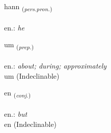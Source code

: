 \documentclass[frontgrid, backgrid]{flacards}\usepackage[]{graphicx}\usepackage[]{xcolor}
\begin{document}
{hann \small{\textsubscript{(\textit{pers.pron.})}} \\[1ex] %
\textphonetic{[han]} \\
en.: \emph{he} \\  [2ex]
\renewcommand*{\arraystretch}{0.8}
}


\renewcommand{\flhead}{\vskip5pt \fboxsep=0pt {\small\bfseries\footnotesize Forsetning | Preposition}}
\renewcommand{\fcfoot}{\vskip5pt \fboxsep=0pt \hspace{2pt}{\small\bfseries\footnotesize 1K}}

\renewcommand{\blhead}{\vskip5pt {\small\bfseries\footnotesize Forsetning | Preposition }}
\renewcommand{\bcfoot}{\vskip5pt \hspace{2pt}{\small\bfseries\footnotesize 1K}}


{um \small{\textsubscript{(\textit{prep.})}} \\[1ex]
\textphonetic{[ʏm]} \\
en.: \emph{about; during; approximately} \\  [2ex]
um (Indeclinable)}


\renewcommand{\flhead}{\vskip5pt \fboxsep=0pt {\small\bfseries\footnotesize Samtenging | Conjuction}}
\renewcommand{\fcfoot}{\vskip5pt \fboxsep=0pt \hspace{2pt}{\small\bfseries\footnotesize 1K}}

\renewcommand{\blhead}{\vskip5pt {\small\bfseries\footnotesize Samtenging | Conjuction }}
\renewcommand{\bcfoot}{\vskip5pt \hspace{2pt}{\small\bfseries\footnotesize 1K}}


{en \small{\textsubscript{(\textit{conj.})}} \\[1ex]
\textphonetic{[ɛn]} \\
en.: \emph{but} \\  [2ex]
en (Indeclinable)}
\end{document}

